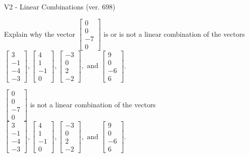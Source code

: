\begin{exercise}
  \begin{exerciseTitle}V2 - Linear Combinations (ver. 698)\end{exerciseTitle}
  \begin{exerciseStatement}
    Explain why the vector \(\left[\begin{array}{c}
0 \\
0 \\
-7 \\
0
\end{array}\right]\)  is or is not a linear 
	combination of the vectors \(\left[\begin{array}{c}
3 \\
-1 \\
-4 \\
-3
\end{array}\right] , \left[\begin{array}{c}
4 \\
1 \\
-1 \\
0
\end{array}\right] , \left[\begin{array}{c}
-3 \\
0 \\
2 \\
-2
\end{array}\right] , \text{ and } \left[\begin{array}{c}
9 \\
0 \\
-6 \\
6
\end{array}\right]\).
	


  \end{exerciseStatement}
  \begin{exerciseAnswer}
   \(\left[\begin{array}{c}
0 \\
0 \\
-7 \\
0
\end{array}\right]\) 
  	 is not  
	a linear combination of the vectors \(\left[\begin{array}{c}
3 \\
-1 \\
-4 \\
-3
\end{array}\right] , \left[\begin{array}{c}
4 \\
1 \\
-1 \\
0
\end{array}\right] , \left[\begin{array}{c}
-3 \\
0 \\
2 \\
-2
\end{array}\right] , \text{ and } \left[\begin{array}{c}
9 \\
0 \\
-6 \\
6
\end{array}\right]\).


\end{exerciseAnswer}
\end{exercise}
